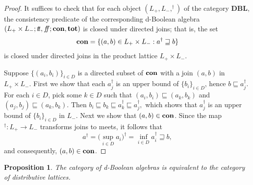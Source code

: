 \documentclass[11pt]{article}
\theoremstyle{plain}
\newtheorem{prop}[thm]{Proposition}
\theoremstyle{definition}
\newcommand{\dbt}{{t\!t}}
\newcommand{\dbf}{{f\!\!f}}
\newcommand{\lra}{\longrightarrow}
\begin{document}
\begin{proof} It suffices to check that for each object $(L_+,L_-, ^\dag)$ of the category {\bf DBL},   the consistency predicate of the corresponding  d-Boolean algebra $(L_+\times L_-;\dbt,\dbf;{\bf con},{\bf tot})$ is closed under directed joins; that is, the set  $${\bf con}=\{(a,b)\in L_+\times L_-: a^\dag\sqsupseteq b\}$$  is closed under directed joins in the product lattice $L_+\times L_-$. 

Suppose  $\{(a_i,b_i)\}_{i\in D}$ is a directed subset of ${\bf con}$ with a join $(a,b)$ in $L_+\times L_-$. First we show that each $a_j^\dag$ is an upper bound of $\{b_i\}_{i\in D}$, hence $b\sqsubseteq a_j^\dag$. For each $i\in D$, pick some $k\in D$ such that $(a_i,b_i) \sqsubseteq (a_k,b_k)$ and $(a_j,b_j)\sqsubseteq (a_k,b_k)$. Then  $b_i\sqsubseteq b_k\sqsubseteq  a_k^\dag \sqsubseteq  a_j^\dag, $  which shows that $ a_j^\dag$ is an upper bound of $\{b_i\}_{i\in D}$ in $L_-$. Next we show that $(a,b)\in{\bf con}$. Since the map $ ^\dag\colon L_+\lra L_-$ transforms joins to meets, it follows that $$ a^\dag=\big(\sup_{i\in D} a_i\big)^\dag= \inf_{i\in D}a_i^\dag \sqsupseteq b,$$ and consequently, $(a,b)\in{\bf con}$. \end{proof}

\begin{prop}\label{DLat and DBL} The category of d-Boolean algebras is  equivalent to the category of distributive lattices. 
\end{prop}
\end{document}
